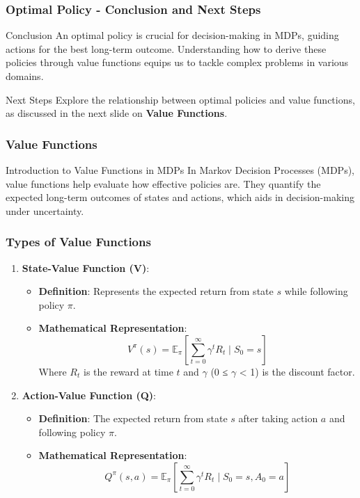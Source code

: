 \documentclass[aspectratio=169]{beamer}
\begin{document}
\begin{frame}[fragile]
    \frametitle{Optimal Policy - Conclusion and Next Steps}
    \begin{block}{Conclusion}
        An optimal policy is crucial for decision-making in MDPs, guiding actions for the best long-term outcome. Understanding how to derive these policies through value functions equips us to tackle complex problems in various domains.
    \end{block}

    \begin{block}{Next Steps}
        Explore the relationship between optimal policies and value functions, as discussed in the next slide on \textbf{Value Functions}.
    \end{block}
\end{frame}

\begin{frame}[fragile]
    \frametitle{Value Functions}
    \begin{block}{Introduction to Value Functions in MDPs}
        In Markov Decision Processes (MDPs), value functions help evaluate how effective policies are. They quantify the expected long-term outcomes of states and actions, which aids in decision-making under uncertainty.
    \end{block}
\end{frame}

\begin{frame}[fragile]
    \frametitle{Types of Value Functions}
    \begin{enumerate}
        \item \textbf{State-Value Function (V)}:
        \begin{itemize}
            \item \textbf{Definition}: Represents the expected return from state \( s \) while following policy \( \pi \).
            \item \textbf{Mathematical Representation}:
            \begin{equation}
                V^\pi(s) = \mathbb{E}_\pi \left[ \sum_{t=0}^{\infty} \gamma^t R_t \mid S_0=s \right]
            \end{equation}
            Where \( R_t \) is the reward at time \( t \) and \( \gamma \) (0 ≤ \( \gamma \) < 1) is the discount factor.
        \end{itemize}
        
        \item \textbf{Action-Value Function (Q)}:
        \begin{itemize}
            \item \textbf{Definition}: The expected return from state \( s \) after taking action \( a \) and following policy \( \pi \).
            \item \textbf{Mathematical Representation}:
            \begin{equation}
                Q^\pi(s, a) = \mathbb{E}_\pi \left[ \sum_{t=0}^{\infty} \gamma^t R_t \mid S_0=s, A_0=a \right]
            \end{equation}
        \end{itemize}
    \end{enumerate}
\end{frame}
\end{document}

